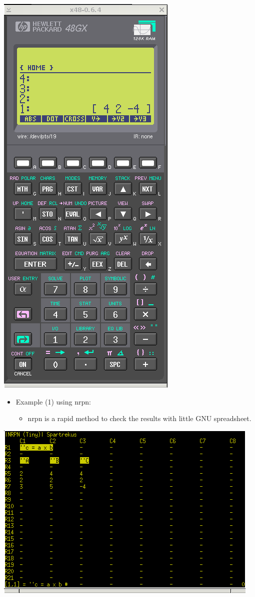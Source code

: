 \documentclass[11pt]{article}
\begin{document}
\includegraphics[scale,height=0.8\textheight]{20180422153111-cross-product02.png}


\begin{itemize}
\item Example (1) using nrpn:
\begin{itemize}
\item nrpn is a rapid method to check the results with little GNU spreadsheet.
\end{itemize}
\end{itemize}


\includegraphics[scale,height=0.5\textheight]{20180422155226-cross-product02.png}
\end{document}
